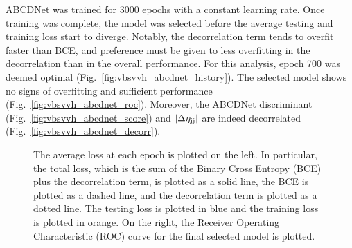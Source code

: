 ABCDNet was trained for 3000 epochs with a constant learning rate. 
Once training was complete, the model was selected before the average testing and training loss start to diverge. 
Notably, the decorrelation term tends to overfit faster than BCE, and preference must be given to less overfitting in the decorrelation than in the overall performance. 
For this analysis, epoch 700 was deemed optimal (Fig.~\ref{fig:vbsvvh_abcdnet_history}).
The selected model shows no signs of overfitting and sufficient performance (Fig.~\ref{fig:vbsvvh_abcdnet_roc}). 
Moreover, the ABCDNet discriminant (Fig.~\ref{fig:vbsvvh_abcdnet_score}) and $|\Delta\eta_{\mathrm{j}\mathrm{j}}|$ are indeed decorrelated (Fig.~\ref{fig:vbsvvh_abcdnet_decorr}).

\begin{figure}[htb]
    \centering
    \qquad
    \caption{
        The average loss at each epoch is plotted on the left. 
        In particular, the total loss, which is the sum of the Binary Cross Entropy (BCE) plus the decorrelation term, is plotted as a solid line, the BCE is plotted as a dashed line, and the decorrelation term is plotted as a dotted line. 
        The testing loss is plotted in blue and the training loss is plotted in orange. 
        On the right, the Receiver Operating Characteristic (ROC) curve for the final selected model is plotted. 
    }
    \label{fig:vbsvvh_abcdnet_perf}
\end{figure}

